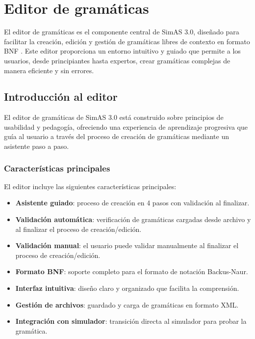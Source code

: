 \chapter{Editor de gramáticas}

El editor de gramáticas es el componente central de SimAS 3.0, diseñado para facilitar la creación, edición y gestión de gramáticas libres de contexto en formato BNF \cite{bnf}. Este editor proporciona un entorno intuitivo y guiado que permite a los usuarios, desde principiantes hasta expertos, crear gramáticas complejas de manera eficiente y sin errores.

\section{Introducción al editor}

El editor de gramáticas de SimAS 3.0 está construido sobre principios de usabilidad y pedagogía, ofreciendo una experiencia de aprendizaje progresiva que guía al usuario a través del proceso de creación de gramáticas mediante un asistente paso a paso.

\subsection{Características principales}

El editor incluye las siguientes características principales:

\begin{itemize}
    \item \textbf{Asistente guiado}: proceso de creación en 4 pasos con validación al finalizar.
    \item \textbf{Validación automática}: verificación de gramáticas cargadas desde archivo y al finalizar el proceso de creación/edición.
    \item \textbf{Validación manual}: el usuario puede validar manualmente al finalizar el proceso de creación/edición.
    \item \textbf{Formato BNF}: soporte completo para el formato de notación Backus-Naur.
    \item \textbf{Interfaz intuitiva}: diseño claro y organizado que facilita la comprensión.
    \item \textbf{Gestión de archivos}: guardado y carga de gramáticas en formato XML.
    \item \textbf{Integración con simulador}: transición directa al simulador para probar la gramática.
\end{itemize}

